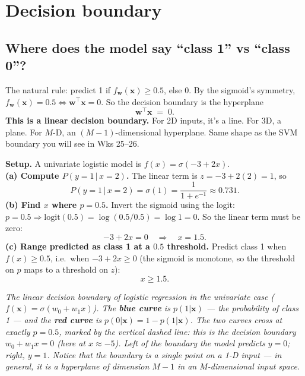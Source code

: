 \documentclass[11pt, a4paper]{article}
\begin{document}
\section{Decision boundary}

\subsection{Where does the model say ``class 1'' vs ``class 0''?}

The natural rule: predict 1 if $f_\mathbf{w}(\mathbf{x}) \ge 0.5$, else 0. By the sigmoid's symmetry, $f_\mathbf{w}(\mathbf{x}) = 0.5 \iff \mathbf{w}^\top\mathbf{x} = 0$. So the decision boundary is the hyperplane
\[
\boxed{\;\mathbf{w}^\top\mathbf{x} \;=\; 0.\;}
\]
\textbf{This is a linear decision boundary.} For 2D inputs, it's a line. For 3D, a plane. For $M$-D, an $(M-1)$-dimensional hyperplane. Same shape as the SVM boundary you will see in Wks 25--26.

\begin{exbox}
\textbf{Setup.} A univariate logistic model is $f(x) = \sigma(-3 + 2x)$.\\[0.2em]
\textbf{(a) Compute $P(y=1\,|\,x=2)$.} The linear term is $z = -3 + 2(2) = 1$, so
\[
P(y=1\,|\,x=2) = \sigma(1) = \frac{1}{1+e^{-1}} \approx 0.731.
\]
\textbf{(b) Find $x$ where $p = 0.5$.} Invert the sigmoid using the logit: $p = 0.5 \Rightarrow \mathrm{logit}(0.5) = \log(0.5/0.5) = \log 1 = 0$. So the linear term must be zero:
\[
-3 + 2x = 0 \quad\Longrightarrow\quad x = 1.5.
\]
\textbf{(c) Range predicted as class 1 at a $0.5$ threshold.} Predict class 1 when $f(x) \ge 0.5$, i.e.\ when $-3 + 2x \ge 0$ (the sigmoid is monotone, so the threshold on $p$ maps to a threshold on $z$):
\[
\boxed{\;x \ge 1.5.\;}
\]
\end{exbox}

\begin{center}

\footnotesize\textit{The linear decision boundary of logistic regression in the univariate case ($f(\mathbf{x}) = \sigma(w_0 + w_1 x)$). The \textbf{blue curve} is $p(1|\mathbf{x})$ --- the probability of class 1 --- and the \textbf{red curve} is $p(0|\mathbf{x}) = 1 - p(1|\mathbf{x})$. The two curves cross at exactly $p = 0.5$, marked by the vertical dashed line: this is the decision boundary $w_0 + w_1 x = 0$ (here at $x \approx -5$). Left of the boundary the model predicts $y=0$; right, $y=1$. Notice that the boundary is a \emph{single point} on a 1-D input --- in general, it is a hyperplane of dimension $M-1$ in an $M$-dimensional input space.}
\end{center}
\end{document}
